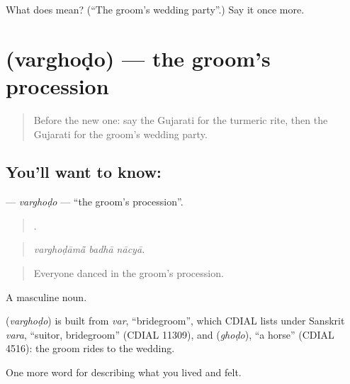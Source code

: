\begin{tcolorbox}[breakable,colback=teal!4,colframe=teal!35!black,title={Before you move on}]
What does  mean? (\textquotedblleft{}The groom's wedding party\textquotedblright{}.) Say it once more.
\end{tcolorbox}
\section[\texorpdfstring{\gu{વરઘોડો} (varghoḍo)}{વરઘોડો (varghoḍo)}]{ (varghoḍo) — the groom's procession}

\label{lesson:GU-C497-varghodo}



\begin{quote}
Before the new one: say the Gujarati for the turmeric rite, then the Gujarati for the groom's wedding party.
\end{quote}

\subsection*{You'll want to know: }
\textbf{} — \emph{varghoḍo} — \textquotedblleft{}the groom's procession\textquotedblright{}.

\begin{quote}
  .
\end{quote}

\begin{quote}
\emph{varghoḍāmā̃ badhā nācyā.}
\end{quote}

\begin{quote}
Everyone danced in the groom's procession.
\end{quote}

A masculine noun.

\begin{cousinweb}
\textbf{} (\emph{varghoḍo}) is built from \emph{var}, \textquotedblleft{}bridegroom\textquotedblright{}, which CDIAL lists under Sanskrit \emph{vara}, \textquotedblleft{}suitor, bridegroom\textquotedblright{} (CDIAL 11309), and \textbf{} (\emph{ghoḍo}), \textquotedblleft{}a horse\textquotedblright{} (CDIAL 4516): the groom rides to the wedding.
\end{cousinweb}

\begin{grammarlens}[title={What you've built}]
One more word for describing what you lived and felt.
\end{grammarlens}

